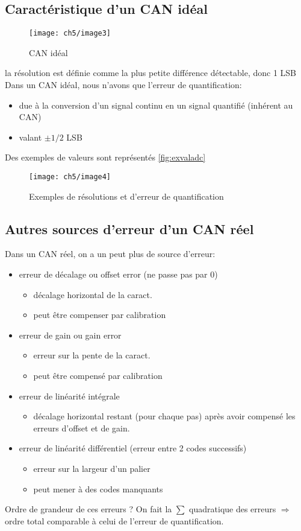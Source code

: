 \subsection{Caractéristique d'un CAN idéal}
\begin{figure}[H] 
	\centering 
	\texttt{[image: ch5/image3]} 
	\caption{CAN idéal} 
\end{figure}
la résolution est définie comme la plus petite différence détectable, donc 1 LSB\\
Dans un CAN idéal, nous n'avons que l'erreur de quantification:
\begin{itemize}
	\item due à la conversion d'un signal continu en un signal quantifié (inhérent au CAN)
	\item valant \(\pm 1/2\) LSB
\end{itemize}
Des exemples de valeurs sont représentés \autoref{fig:exvaladc}
\begin{figure}[H] 
	\centering 
	\texttt{[image: ch5/image4]} 
	\caption{Exemples de résolutions et d'erreur de quantification}
	\label{fig:exvaladc} 
\end{figure}
\subsection{Autres sources d'erreur d'un CAN réel}
Dans un CAN réel, on a un peut plus de source d'erreur:
\begin{itemize}
	\item erreur de décalage ou offset error (ne passe pas par 0)
	\begin{itemize}
		\item décalage horizontal de la caract.
		\item peut être compenser par calibration
	\end{itemize}
	\item erreur de gain ou gain error
	\begin{itemize}
		\item erreur sur la pente de la caract.
		\item peut être compensé par calibration
	\end{itemize}
	\item erreur de linéarité intégrale
	\begin{itemize}
		\item décalage horizontal restant (pour chaque pas) après avoir compensé les erreurs d'offset et de gain.
	\end{itemize}
	\item erreur de linéarité différentiel (erreur entre 2 codes successifs)
	\begin{itemize}
		\item erreur sur la largeur d'un palier
		\item peut mener à des codes manquants
	\end{itemize}
\end{itemize}
Ordre de grandeur de ces erreurs ? On fait la \(\sum\) quadratique des erreurs \(\Rightarrow\) ordre total comparable à celui de l'erreur de quantification.
